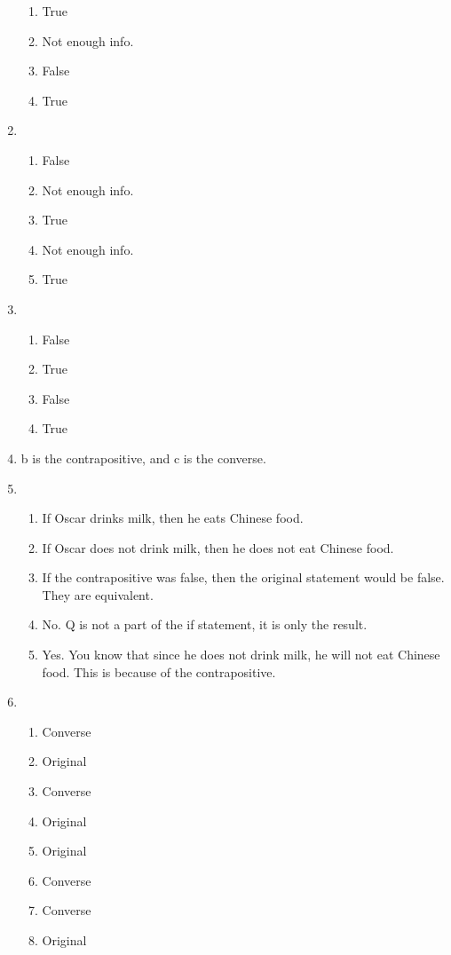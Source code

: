 \begin{enumerate}
\begin{enumerate}
            \item True
            \item Not enough info.
            \item False
            \item True
        \end{enumerate}
    \item
        \begin{enumerate}
            \item False
            \item Not enough info.
            \item True
            \item Not enough info.
            \item True
        \end{enumerate}
    \item 
        \begin{enumerate}
            \item False
            \item True
            \item False
            \item True
        \end{enumerate}
    \item b is the contrapositive, and c is the converse. 
    \item 
        \begin{enumerate}
            \item If Oscar drinks milk, then he eats Chinese food.
            \item If Oscar does not drink milk, then he does not eat Chinese food.
            \item If the contrapositive was false, then the original statement would be false. They are equivalent.
            \item No. Q is not a part of the if statement, it is only the result.
            \item Yes. You know that since he does not drink milk, he will not eat Chinese food. This is because of the contrapositive.
        \end{enumerate}
    \item 
        \begin{enumerate}
            \item Converse
            \item Original
            \item Converse
            \item Original
            \item Original
            \item Converse
            \item Converse
            \item Original
        \end{enumerate}
\end{enumerate}
